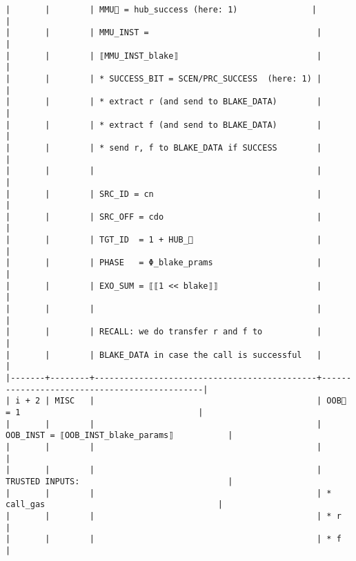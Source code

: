 \documentclass[varwidth=\maxdimen,margin=0.5cm,multi={verbatim}]{standalone}
\begin{document}
\begin{verbatim}
|       |        | MMU🏴 = hub_success (here: 1)               |                                              |
|       |        | MMU_INST =                                  |                                              |
|       |        | ⟦MMU_INST_blake⟧                            |                                              |
|       |        | * SUCCESS_BIT = SCEN/PRC_SUCCESS  (here: 1) |                                              |
|       |        | * extract r (and send to BLAKE_DATA)        |                                              |
|       |        | * extract f (and send to BLAKE_DATA)        |                                              |
|       |        | * send r, f to BLAKE_DATA if SUCCESS        |                                              |
|       |        |                                             |                                              |
|       |        | SRC_ID = cn                                 |                                              |
|       |        | SRC_OFF = cdo                               |                                              |
|       |        | TGT_ID  = 1 + HUB_                         |                                              |
|       |        | PHASE   = Φ_blake_prams                     |                                              |
|       |        | EXO_SUM = ⟦⟦1 << blake⟧⟧                    |                                              |
|       |        |                                             |                                              |
|       |        | RECALL: we do transfer r and f to           |                                              |
|       |        | BLAKE_DATA in case the call is successful   |                                              |
|-------+--------+---------------------------------------------+----------------------------------------------|
| i + 2 | MISC   |                                             | OOB🏴 = 1                                    |
|       |        |                                             | OOB_INST = ⟦OOB_INST_blake_params⟧           |
|       |        |                                             |                                              |
|       |        |                                             | TRUSTED INPUTS:                              |
|       |        |                                             | * call_gas                                   |
|       |        |                                             | * r                                          |
|       |        |                                             | * f                                          |

\end{verbatim}
\end{document}

